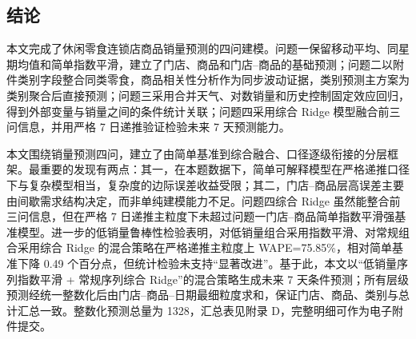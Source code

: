\subsection{结论}

本文完成了休闲零食连锁店商品销量预测的四问建模。问题一保留移动平均、同星期均值和简单指数平滑，建立了门店、商品和门店--商品的基础预测；问题二以附件类别字段整合同类零食，商品相关性分析作为同步波动证据，类别预测主方案为类别聚合后直接预测；问题三采用合并天气、对数销量和历史控制固定效应回归，得到外部变量与销量之间的条件统计关联；问题四采用综合 Ridge 模型融合前三问信息，并用严格 7 日递推验证检验未来 7 天预测能力。

本文围绕销量预测四问，建立了由简单基准到综合融合、口径逐级衔接的分层框架。最重要的发现有两点：其一，在本题数据下，简单可解释模型在严格递推口径下与复杂模型相当，复杂度的边际误差收益受限；其二，门店--商品层高误差主要由间歇需求结构决定，而非单纯建模能力不足。问题四综合 Ridge 虽然能整合前三问信息，但在严格 7 日递推主粒度下未超过问题一门店--商品简单指数平滑强基准模型。进一步的低销量鲁棒性检验表明，对低销量组合采用指数平滑、对常规组合采用综合 Ridge 的混合策略在严格递推主粒度上 WAPE=75.85\%，相对简单基准下降 0.49 个百分点，但统计检验未支持“显著改进”。基于此，本文以“低销量序列指数平滑 + 常规序列综合 Ridge”的混合策略生成未来 7 天条件预测；所有层级预测经统一整数化后由门店--商品--日期最细粒度求和，保证门店、商品、类别与总计汇总一致。整数化预测总量为 1328，汇总表见附录 D，完整明细可作为电子附件提交。
